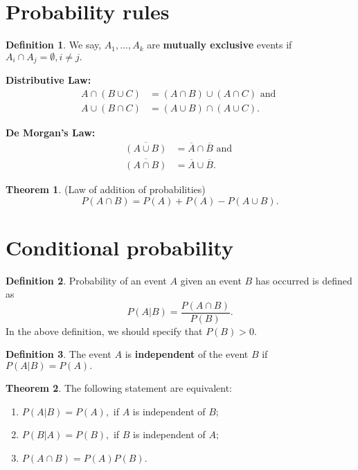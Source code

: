 \documentclass[12pt, a4paper]{article}
\theoremstyle{definition}
\newtheorem{definition}{Definition}[section]
\newtheorem{theorem}{Theorem}[section]
\theoremstyle{plain}
\begin{document}
\section{Probability rules}

\begin{definition}
We say, $A_1,\ldots,A_k$ are \textbf{mutually exclusive} events if $A_i \cap A_j = \emptyset, i \neq j.$
\end{definition}

\textbf{Distributive Law:} $$\begin{aligned}A\cap (B \cup C) &= (A \cap B)\cup (A \cap C)  \text{ and } \\ A\cup (B \cap C) &= (A \cup B)\cap (A \cup C).\end{aligned}$$

\textbf{De Morgan's Law:} $$\begin{aligned} \overline{(A\cup B)} &= \overline{A}\cap \overline{B} \text{ and } \\ \overline{(A \cap B)} &= \overline{A}\cup \overline{B}.\end{aligned}$$

\begin{theorem}
(Law of addition of probabilities) $$P(A \cap B)=P(A)+P(A)-P(A \cup B).$$
\end{theorem}

\section{Conditional probability}

\begin{definition}
Probability of an event $A$ given an event $B$ has occurred is defined as $$P(A|B)=\frac{P(A\cap B)}{P(B)}.$$ In the above definition, we should specify that $P(B) > 0.$
\end{definition}

\begin{definition}
The event $A$ is \textbf{independent} of the event $B$ if $P(A|B) = P(A).$
\end{definition}

\begin{theorem} 
The following statement are equivalent:
\begin{enumerate}
	
	\item $P (A|B) = P (A),$ if $A$ is independent of $B;$

	\item $P(B|A) = P (B),$ if $B$ is independent of $A;$

	\item $P(A \cap B) = P(A)P(B).$

\end{enumerate}
\end{theorem}
\end{document}
